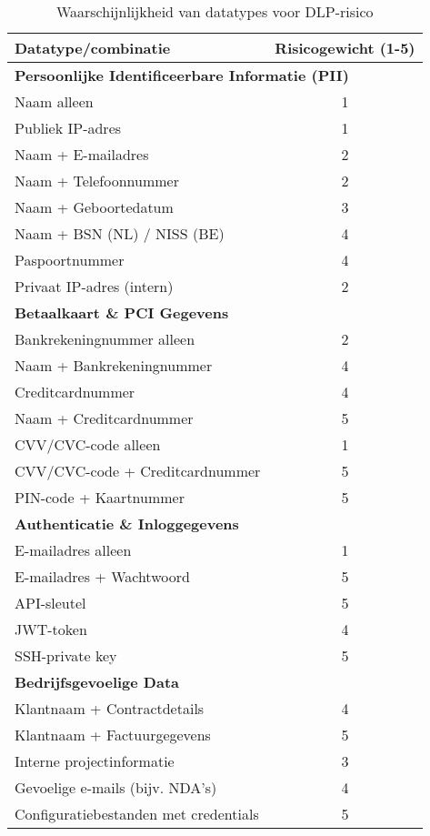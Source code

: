 \begin{table}[h]
    \centering
    \small
    \begin{tabular}{|l|c|}
    \hline
    \textbf{Datatype/combinatie} & \textbf{Risicogewicht (1-5)} \\
    \hline
    \multicolumn{2}{|l|}{\textbf{Persoonlijke Identificeerbare Informatie (PII)}} \\
    \hline
    Naam alleen                 & 1 \\
    Publiek IP-adres            & 1 \\
    Naam + E-mailadres          & 2 \\
    Naam + Telefoonnummer       & 2 \\
    Naam + Geboortedatum        & 3 \\
    Naam + BSN (NL) / NISS (BE) & 4 \\
    Paspoortnummer              & 4 \\
    Privaat IP-adres (intern)   & 2 \\
    \hline
    \multicolumn{2}{|l|}{\textbf{Betaalkaart \& PCI Gegevens}} \\
    \hline
    Bankrekeningnummer alleen   & 2 \\
    Naam + Bankrekeningnummer   & 4 \\
    Creditcardnummer            & 4 \\
    Naam + Creditcardnummer     & 5 \\
    CVV/CVC-code alleen         & 1 \\
    CVV/CVC-code + Creditcardnummer & 5 \\
    PIN-code + Kaartnummer      & 5 \\
    \hline
    \multicolumn{2}{|l|}{\textbf{Authenticatie \& Inloggegevens}} \\
    \hline
    E-mailadres alleen          & 1 \\
    E-mailadres + Wachtwoord    & 5 \\
    API-sleutel                 & 5 \\
    JWT-token                   & 4 \\
    SSH-private key             & 5 \\
    \hline
    \multicolumn{2}{|l|}{\textbf{Bedrijfsgevoelige Data}} \\
    \hline
    Klantnaam + Contractdetails & 4 \\
    Klantnaam + Factuurgegevens & 5 \\
    Interne projectinformatie   & 3 \\
    Gevoelige e-mails (bijv. NDA's) & 4 \\
    Configuratiebestanden met credentials & 5 \\
    \hline
    \end{tabular}
    \caption{Waarschijnlijkheid van datatypes voor DLP-risico}
    \label{tab:datatypes_risico}
\end{table}


